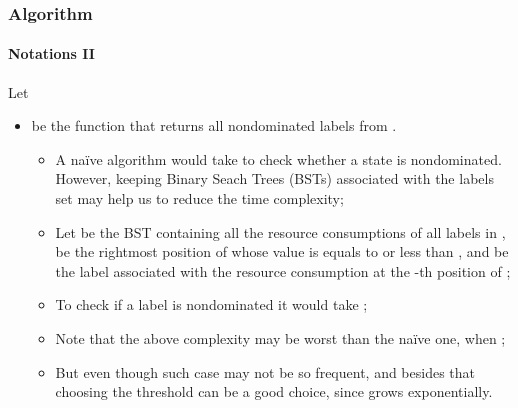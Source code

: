 \begin{frame}
  \frametitle{Algorithm}
  \framesubtitle{Notations II}
  Let
  \begin{itemize}
    \item {} be the function that returns all nondominated labels from \blue{$\Lambda$}. 
      \begin{itemize}
        \item A na\"{i}ve algorithm would take  to check whether a state is nondominated. However, keeping  Binary Seach Trees (BSTs) associated with the labels set  may help us to reduce the time complexity;
        \item Let  be the BST containing all the resource  consumptions of all labels in , 
               be the rightmost position of  whose value is equals to or less than ,
              and  be the label associated with the resource consumption at the -th position of ;
        \item To check if a label  is nondominated it would take ;
        \item Note that the above complexity may be worst than the na\"{i}ve one, when ;
        \item But even though such case may not be so frequent, and besides that choosing the threshold  can be a good choice, since  grows exponentially.
      \end{itemize}
  \end{itemize}
\end{frame}

